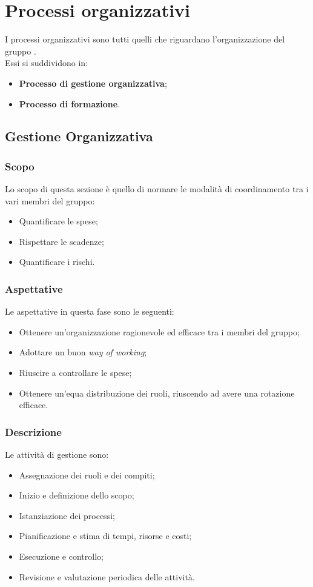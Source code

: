 \section{Processi organizzativi}\label{section:processi_organizzativi}
I processi organizzativi sono tutti quelli che riguardano l'organizzazione del gruppo \groupName.\\ Essi si suddividono in:
\begin{itemize}
  \item \textbf{Processo di gestione organizzativa};
  \item \textbf{Processo di formazione}.
\end{itemize}

\subsection{Gestione Organizzativa} \label{subsection:gestione_organizzativa}
\subsubsection {Scopo}
Lo scopo di questa sezione è quello di normare le modalità di coordinamento tra i vari membri del gruppo:
\begin {itemize}
\item Quantificare le spese;
\item Rispettare le scadenze;
\item Quantificare i rischi.
\end{itemize}
\subsubsection{Aspettative}
Le aspettative in questa fase sono le seguenti:
\begin {itemize}
\item Ottenere un'organizzazione ragionevole ed efficace tra i membri del gruppo;
\item Adottare un buon \textit{way of working};
\item Riuscire a controllare le spese;
\item Ottenere un'equa distribuzione dei ruoli, riuscendo ad avere una rotazione efficace.
\end {itemize}
\subsubsection{Descrizione}
Le attività di gestione sono:
\begin {itemize}
\item Assegnazione dei ruoli e dei compiti;
\item Inizio e definizione dello scopo;
\item Istanziazione dei processi;
\item Pianificazione e stima di tempi, risorse e costi;
\item Esecuzione e controllo;
\item Revisione e valutazione periodica delle attività.
\end {itemize}
